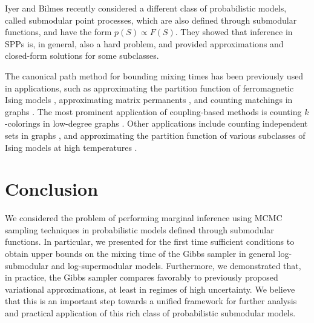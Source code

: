 Iyer and Bilmes \cite{iyer15} recently considered a different class of probabilistic models, called submodular point processes, which are also defined through submodular functions, and have the form $p(S) \propto F(S)$.
They showed that inference in SPPs is, in general, also a hard problem, and provided approximations and closed-form solutions for some subclasses.

The canonical path method for bounding mixing times has been previously used in applications, such as approximating the partition function of ferromagnetic Ising models \cite{jerrum93}, approximating matrix permanents \cite{jerrum89,jerrum04perm}, and counting matchings in graphs \cite{jerrum03}.
The most prominent application of coupling-based methods is counting $k$-colorings in low-degree graphs \cite{jerrum95,bubley98,jerrum03}.
Other applications include counting independent sets in graphs \cite{dyer00}, and approximating the partition function of various subclasses of Ising models at high temperatures \cite{levin08}.



\section{Conclusion}
We considered the problem of performing marginal inference using MCMC sampling techniques in probabilistic models defined through submodular functions.
In particular, we presented for the first time sufficient conditions to obtain upper bounds on the mixing time of the Gibbs sampler in general log-submodular and log-supermodular models.
Furthermore, we demonstrated that, in practice, the Gibbs sampler compares favorably to previously proposed variational approximations, at least in regimes of high uncertainty.
We believe that this is an important step towards a unified framework for further analysis and practical application of this rich class of probabilistic submodular models.
